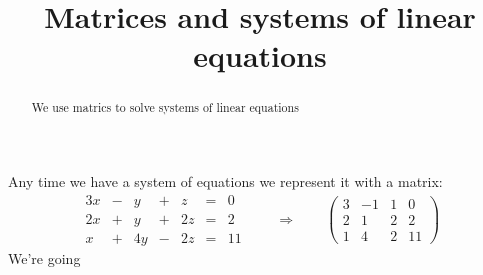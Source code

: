 \documentclass{ximera}
\title{Matrices and systems of linear equations}
\begin{document}
\begin{abstract}
  We use matrics to solve systems of linear equations
\end{abstract}
\maketitle



Any time we have a system of equations we represent it with a matrix:
\[
\begin{array}{ccccccc}
      3x & -&y&+&z&= &0 \\
     2x& +&y&+&2z&=&2\\
     x& +&4y&-&2z&=&11
\end{array}
\qquad\Rightarrow\qquad
\left(\begin{array}{ccc|c}
  3 & -1 & 1 & 0 \\
  2 &  1 & 2 & 2 \\
  1 &  4 & 2 & 11 
\end{array}\right)
\]
We're going 
\end{document}
